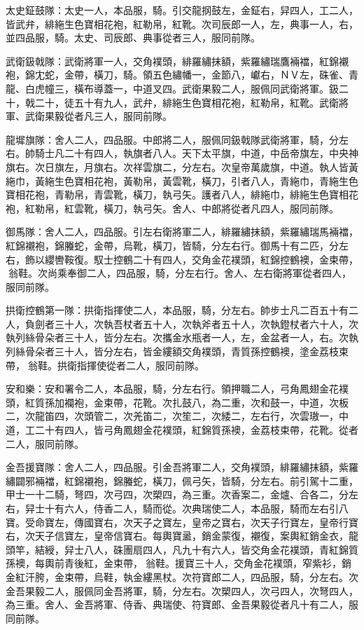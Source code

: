 \begin{pinyinscope}
 太史鉦鼓隊：太史一人，本品服，騎。引交龍㧏鼓左，金鉦右，舁四人，工二人，皆武弁，緋絁生色寶相花袍，紅勒帛，紅靴。次司辰郎一人，左，典事一人，右，並四品服，騎。太史、司辰郎、典事從者三人，服同前隊。



 武衛鈒戟隊：武衛將軍一人，交角襆頭，緋羅繡抹額，紫羅繡瑞鷹裲襠，紅錦襯袍，錦冘蛇，金帶，橫刀，騎。領五色繡幡一，金節八，巘右，ＮＶ左，硃雀、青龍、白虎幢三，橫布導蓋一，中道叉四。武衛果毅二人，服佩同武衛將軍。鈒二十，戟二十，徒五十有九人，武弁，緋絁生色寶相花袍，紅勒帛，紅靴。武衛將軍、武衛果毅從者凡三人，服同前隊。



 龍墀旗隊：舍人二人，四品服。中郎將二人，服佩同鈒戟隊武衛將軍，騎，分左右。帥騎士凡二十有四人，執旗者八人。天下太平旗，中道，中岳帝旗左，中央神旗右。次日旗左，月旗右。次祥雲旗二，分左右。次皇帝萬歲旗，中道。執人皆黃絁巾，黃絁生色寶相花袍，黃勒帛，黃雲靴，橫刀，引者八人，青絁巾，青絁生色寶相花袍，青勒帛，青雲靴，橫刀，執弓矢。護者八人，緋絁巾，緋絁生色寶相花袍，紅勒帛，紅雲靴，橫刀，執弓矢。舍人、中郎將從者凡四人，服同前隊。



 御馬隊：舍人二人，四品服。引左右衛將軍二人，緋羅繡抹額，紫羅繡瑞馬裲襠，紅錦襯袍，錦螣蛇，金帶，烏靴，橫刀，皆騎，分左右行。御馬十有二匹，分左右，飾以纓轡鞍復。馭士控鶴二十有四人，交角金花襆頭，紅錦控鶴襖，金束帶，翁鞋。次尚乘奉御二人，四品服，騎，分左右行。舍人、左右衛將軍從者四人，服同前隊。



 拱衛控鶴第一隊：拱衛指揮使二人，本品服，騎，分左右。帥步士凡二百五十有二人，負劍者三十人，次執吾杖者五十人，次執斧者五十人，次執鐙杖者六十人，次執列絲骨朵者三十人，皆分左右。次攜金水瓶者一人，左，金盆者一人，右。次執列絲骨朵者三十人，皆分左右，皆金縷額交角襆頭，青質孫控鶴襖，塗金荔枝束帶，翁鞋。拱衛指揮使從者二人，服同前隊。



 安和樂：安和署令二人，本品服，騎，分左右行。領押職二人，弓角鳳翅金花襆頭，紅質孫加襴袍，金束帶，花靴。次扎鼓八，為二重，次和鼓一，中道，次板二，次龍笛四，次頭管二，次羌笛二，次笙二，次緌二，左右行，次雲璈一，中道，工二十有四人，皆弓角鳳翅金花襆頭，紅錦質孫襖，金荔枝束帶，花靴。從者二人，服同前隊。



 金吾援寶隊：舍人二人，四品服。引金吾將軍二人，交角襆頭，緋羅繡抹額，紫羅繡闢邪裲襠，紅錦襯袍，錦螣蛇，橫刀，佩弓矢，皆騎，分左右。前引駕十二重，甲士一十二騎，弩四，次弓四，次槊四，為三重。次香案二，金爐、合各二，分左右，舁士十有六人，侍香二人，騎而從。次典瑞使二人，本品服，騎而左右引八寶。受命寶左，傳國寶右，次天子之寶左，皇帝之寶右，次天子行寶左，皇帝行寶右，次天子信寶左，皇帝信寶右。每輿寶盝，銷金蒙復，襯復，案輿紅銷金衣，龍頭竿，結綬，舁士八人，硃團扇四人，凡九十有六人，皆交角金花襆頭，青紅錦質孫襖，每輿前青後紅，金束帶，翁鞋。援寶三十人，交角金花襆頭，窄紫衫，銷金紅汗胯，金束帶，烏鞋，執金縷黑杖。次符寶郎二人，四品服，騎，分左右。次金吾果毅二人，服佩同金吾將軍，騎，分左右。次槊四人，次弓四人，次弩四人，為三重。舍人、金吾將軍、侍香、典瑞使、符寶郎、金吾果毅從者凡十有二人，服同前隊。




\end{pinyinscope}

